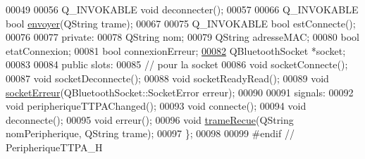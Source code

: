 \begin{DoxyCode}
00049 
00056     Q\_INVOKABLE \textcolor{keywordtype}{void} deconnecter();
00057 
00066     Q\_INVOKABLE \textcolor{keywordtype}{bool} \hyperlink{class_peripherique_t_t_p_a_a529048ac8be73560038bbeee0047b634}{envoyer}(QString trame);
00067 
00075     Q\_INVOKABLE \textcolor{keywordtype}{bool} estConnecte();
00076 
00077 private:
00078     QString nom; 
00079     QString adresseMAC; 
00080     \textcolor{keywordtype}{bool} etatConnexion; 
00081     \textcolor{keywordtype}{bool} connexionErreur; 
\hyperlink{class_peripherique_t_t_p_a_ab66f30984a7f9fa17fd28391efe968a9}{00082}     QBluetoothSocket *socket; 
00083 
00084 public slots:
00085     \textcolor{comment}{// pour la socket}
00086     \textcolor{keywordtype}{void} socketConnecte(); 
00087     \textcolor{keywordtype}{void} socketDeconnecte(); 
00088     \textcolor{keywordtype}{void} socketReadyRead(); 
00089     \textcolor{keywordtype}{void} \hyperlink{class_peripherique_t_t_p_a_a85811ace874ff7cea3437146511f1b2c}{socketErreur}(QBluetoothSocket::SocketError erreur); 
00090 
00091 signals:
00092     \textcolor{keywordtype}{void} peripheriqueTTPAChanged(); 
00093     \textcolor{keywordtype}{void} connecte(); 
00094     \textcolor{keywordtype}{void} deconnecte(); 
00095     \textcolor{keywordtype}{void} erreur(); 
00096     \textcolor{keywordtype}{void} \hyperlink{class_peripherique_t_t_p_a_aaa8699b83c9659c874a0d066ea633e45}{trameRecue}(QString nomPeripherique, QString trame);  
00097 \};
00098 
00099 \textcolor{preprocessor}{#endif // PeripheriqueTTPA\_H}
\end{DoxyCode}

